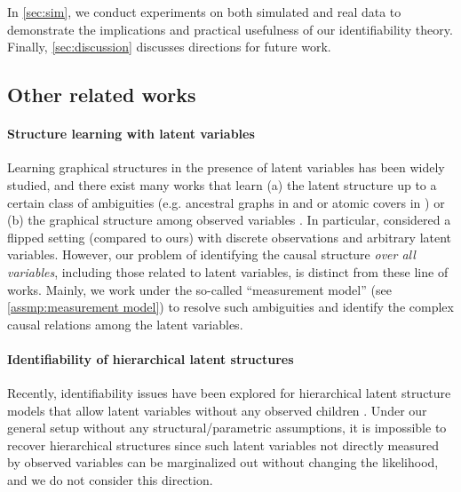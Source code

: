 \documentclass[10pt]{article} %
\begin{document}
{In \cref{sec:sim}, we conduct experiments on both simulated and real data to demonstrate the implications and practical usefulness of our identifiability theory. Finally, \cref{sec:discussion} discusses directions for future work.}

%


\subsection{Other related works}\label{sec:related works}
\paragraph{Structure learning with latent variables}
Learning graphical structures in the presence of latent variables has been widely studied, and there exist many works that learn (a) the latent structure up to a certain class of ambiguities (e.g. ancestral graphs in \cite{richardson2002ancestral} and \cite{ali2009ancestral} or atomic covers in \cite{xie2022identification}) 
or (b) the graphical structure among observed variables \citep{evans2018margins,frot2019robust,gordon2023causal}. In particular, \cite{evans2018margins} considered a flipped setting (compared to ours) with discrete observations and arbitrary latent variables. %
However, our problem of identifying the causal structure \emph{over all variables}, including those related to latent variables, is distinct from these line of works. {Mainly, we work under the so-called ``measurement model'' (see \cref{assmp:measurement model}) to resolve such ambiguities and identify the complex causal relations among the latent variables.}
%

\paragraph{Identifiability of hierarchical latent structures}
%
%
%
Recently, identifiability issues have been explored for hierarchical latent structure models that allow latent variables without any observed children %
\citep{anandkumar2013learning, xie2022identification, kong2024learning, xie2024generalized, lee2025deep, dong2023versatile}. Under our general setup without any structural/parametric assumptions, it is impossible to recover hierarchical structures since such latent variables not directly measured by observed variables can be marginalized out without changing the likelihood, and we do not consider this direction.

%
\end{document}
